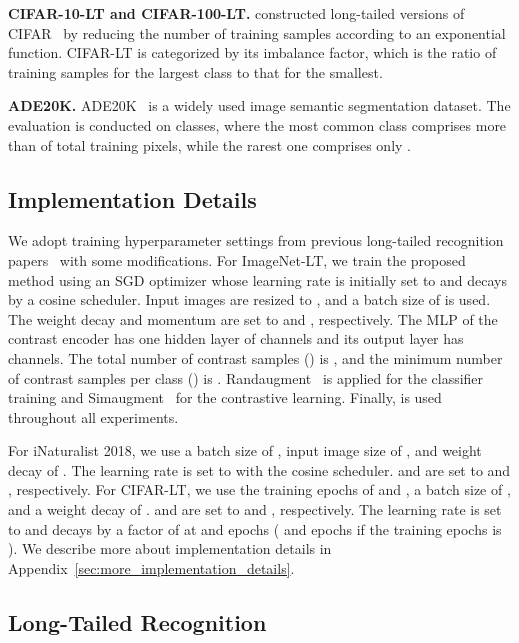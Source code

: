 \documentclass{article}
\theoremstyle{plain}
\theoremstyle{definition}
\theoremstyle{remark}
\begin{document}
\textbf{CIFAR-10-LT and CIFAR-100-LT.} \citet{cui2019class} constructed long-tailed versions of CIFAR~\cite{krizhevsky2009learning} by reducing the number of training samples according to an exponential function. CIFAR-LT is categorized by its imbalance factor, which is the ratio of training samples for the largest class to that for the smallest.

\textbf{ADE20K.} ADE20K~\cite{zhou2017scene} is a widely used image semantic segmentation dataset. The evaluation is conducted on  classes, where the most common class comprises more than  of total training pixels, while the rarest one comprises only .

\subsection{Implementation Details}
We adopt training hyperparameter settings from previous long-tailed recognition papers~\cite{cui2021parametric,tian2021vl,zhu2022balanced} with some modifications. For ImageNet-LT, we train the proposed method using an SGD optimizer whose learning rate is initially set to  and decays by a cosine scheduler. Input images are resized to , and a batch size of  is used. The weight decay and momentum are set to  and , respectively. The MLP of the contrast encoder has one hidden layer of  channels and its output layer has  channels. The total number of contrast samples () is , and the minimum number of contrast samples per class () is . Randaugment~\cite{cubuk2020randaugment} is applied for the classifier training and Simaugment~\cite{chen2020simple} for the contrastive learning. Finally,  is used throughout all experiments.

For iNaturalist 2018, we use a batch size of , input image size of , and weight decay of . The learning rate is set to  with the cosine scheduler.  and  are set to  and , respectively. For CIFAR-LT, we use the training epochs of  and , a batch size of , and a weight decay of .  and  are set to  and , respectively. The learning rate is set to  and decays by a factor of  at  and  epochs ( and  epochs if the training epochs is ). We describe more about implementation details in Appendix~\ref{sec:more_implementation_details}.

\subsection{Long-Tailed Recognition}
\end{document}
